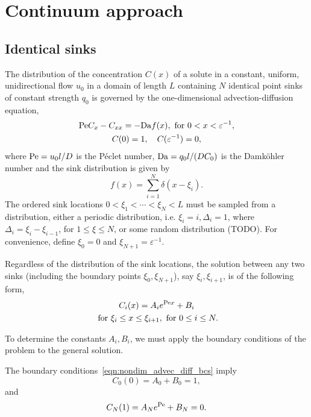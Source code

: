 \chapter{Continuum approach}
\section{Identical sinks}

The distribution of the concentration \(C(x)\) of a solute in a constant,
uniform, unidirectional flow \(u_0\) in a domain of length \(L\) containing
\(N\) identical point sinks of constant strength \(q_0\) is governed by the
one-dimensional advection-diffusion equation,
\begin{subequations}
    \label{eqn:nondim_advec_diff}
    \begin{gather}
        \label{eqn:nondim_advec_diff_eq}
        \mathrm{Pe} C_x - C_{xx} = - \mathrm{Da} f(x), \text{ for } 0 < x < \varepsilon^{-1},\\
        \label{eqn:nondim_advec_diff_bcs}
        C(0) = 1, \quad C(\varepsilon^{-1}) = 0,
    \end{gather}
\end{subequations}
where \(\mathrm{Pe}=u_0 l/D\) is the Péclet number, \(\mathrm{Da}=q_0 l/(D C_0)\) is the
Damköhler number and the sink distribution is given by
\begin{equation}
    \label{eqn:point_sink_dist}
    f(x) = \sum_{i=1}^{N} \delta(x-\xi_i).
\end{equation}
The ordered sink locations \(0 < \xi_1 < \cdots < \xi_N < L\) must be sampled
from a distribution, either a periodic distribution, i.e. \(\xi_i=i,
\Delta_i=1\), where \(\Delta_i = \xi_i - \xi_{i-1}\), for \(1\le\xi\le N\), or
some random distribution (TODO). For convenience, define \(\xi_0 = 0\) and
\(\xi_{N+1} = \varepsilon^{-1}\).

Regardless of the distribution of the sink locations, the solution between any
two sinks (including the boundary points \(\xi_0, \xi_{N+1}\)), say \(\xi_i,
\xi_{i+1}\), is of the following form,
\begin{gather}
    \label{eqn:gen_sol_piece}
    C_i(x)=A_i e^{\mathrm{Pe} x}+B_i\\
    \text{ for } \xi_i \le x \le \xi_{i+1}, \text{ for } 0 \le i \le N.
\end{gather}

To determine the constants \(A_i, B_i\), we must apply the boundary conditions
of the problem to the general solution.

The boundary conditions~\eqref{eqn:nondim_advec_diff_bcs} imply
\begin{equation}
    \label{eqn:bc_A_0_B_0}
    C_0(0) = A_0 + B_0 = 1,
\end{equation}
and
\begin{equation}
    \label{eqn:bc_A_N_B_N}
    C_N(1) = A_N e^{\mathrm{Pe}} + B_N = 0.
\end{equation}

